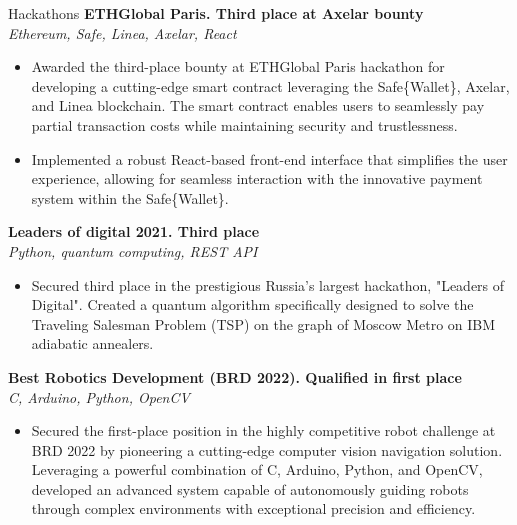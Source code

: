 \documentclass{resume} %
\begin{document}
\begin{rSection}{Hackathons}
{\bf ETHGlobal Paris. Third place at Axelar bounty}  \hfill {}
\\{\textit{Ethereum, Safe, Linea, Axelar, React }}
\begin{itemize}
    \item Awarded the third-place bounty at ETHGlobal Paris hackathon for developing a cutting-edge smart contract leveraging the Safe\{Wallet\}, Axelar, and Linea blockchain. The smart contract enables users to seamlessly pay partial transaction costs while maintaining security and trustlessness.
    \item Implemented a robust React-based front-end interface that simplifies the user experience, allowing for seamless interaction with the innovative payment system within the Safe\{Wallet\}.
\end{itemize}
{\bf Leaders of digital 2021. Third place}   \hfill {}
\\{\textit{Python, quantum computing, REST API}}
\begin{itemize}
    \item Secured third place in the prestigious Russia's largest hackathon, "Leaders of Digital". Created a quantum algorithm specifically designed to solve the Traveling Salesman Problem (TSP) on the graph of Moscow Metro on IBM adiabatic annealers.
\end{itemize}

{\bf Best Robotics Development (BRD 2022). Qualified in first place}  \hfill {}
\\{\textit{ C, Arduino, Python, OpenCV }}
\begin{itemize}
    \item Secured the first-place position in the highly competitive robot challenge at BRD 2022 by pioneering a cutting-edge computer vision navigation solution. Leveraging a powerful combination of C, Arduino, Python, and OpenCV, developed an advanced system capable of autonomously guiding robots through complex environments with exceptional precision and efficiency.
\end{itemize}


\end{rSection}
\end{document}

